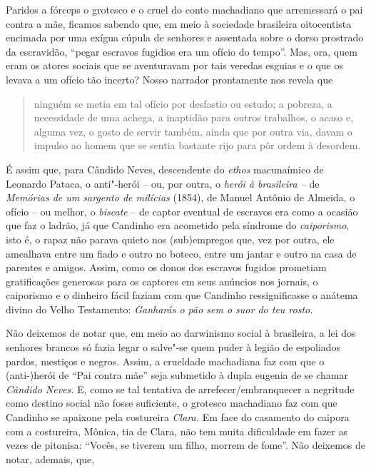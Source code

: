 Paridos a fórceps o grotesco e o cruel do conto machadiano que
arremessará o pai contra a mãe, ficamos sabendo que, em meio à sociedade
brasileira oitocentista encimada por uma exígua cúpula de senhores e
assentada sobre o dorso prostrado da escravidão, ``pegar escravos
fugidios era um ofício do tempo''. Mas, ora, quem eram os atores sociais
que se aventuravam por tais veredas esguias e o que os levava a um
ofício tão incerto? Nosso narrador prontamente nos revela que

\begin{quote}
ninguém se metia em tal ofício por desfastio ou estudo; a pobreza, a
necessidade de uma achega, a inaptidão para outros trabalhos, o acaso e,
alguma vez, o gosto de servir também, ainda que por outra via, davam o
impulso ao homem que se sentia bastante rijo para pôr ordem à desordem.
\end{quote}

É assim que, para Cândido Neves, descendente do \emph{ethos} macunaímico
de Leonardo Pataca, o anti"-herói -- ou, por outra, o \emph{herói à
brasileira --} de \emph{Memórias de um sargento de milícias} (1854), de
Manuel Antônio de Almeida, o ofício -- ou melhor, o \emph{biscate} -- de
captor eventual de escravos era como a ocasião que faz o ladrão, já que
Candinho era acometido pela síndrome do \emph{caiporismo}, isto é, o
rapaz não parava quieto nos (sub)empregos que, vez por outra, ele
amealhava entre um fiado e outro no boteco, entre um jantar e outro na
casa de parentes e amigos. Assim, como os donos dos escravos fugidos
prometiam gratificações generosas para os captores em seus anúncios nos
jornais, o caiporismo e o dinheiro fácil faziam com que Candinho
ressignificasse o anátema divino do Velho Testamento: \emph{Ganharás o
pão sem o suor do teu rosto. }

Não deixemos de notar que, em meio ao darwinismo social à brasileira, a
lei dos senhores brancos só fazia legar o salve"-se quem puder à legião
de espoliados pardos, mestiços e negros. Assim, a crueldade machadiana
faz com que o \mbox{(anti-)herói} de ``Pai contra mãe'' seja submetido à dupla
eugenia de se chamar \emph{Cândido Neves.} E, como se tal tentativa de
arrefecer/embranquecer a negritude como destino social não fosse
suficiente, o grotesco machadiano faz com que Candinho se apaixone pela
costureira \emph{Clara.} Em face do casamento do caipora com a
costureira, Mônica, tia de Clara, não tem muita dificuldade em fazer as
vezes de pitonisa: ``Vocês, se tiverem um filho, morrem de fome''. Não
deixemos de notar, ademais, que,

